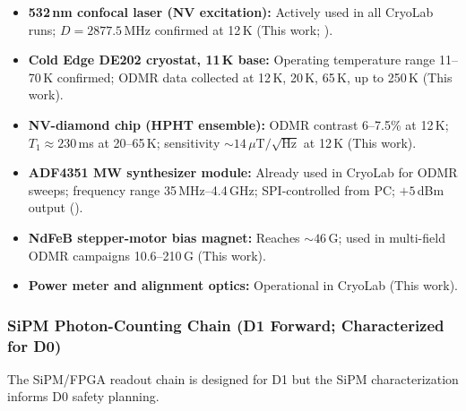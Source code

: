 \begin{itemize}
  \item \textbf{532\,nm confocal laser (NV excitation):} Actively used in all CryoLab
    runs; $D = 2877.5$\,MHz confirmed at 12\,K (This work;
    \cite{Doherty2013}). %
  \item \textbf{Cold Edge DE202 cryostat, 11\,K base:} Operating temperature range 11--70\,K
    confirmed; ODMR data collected at 12\,K, 20\,K, 65\,K, up to 250\,K (This work).
  \item \textbf{NV-diamond chip (HPHT ensemble):} ODMR contrast 6--7.5\% at 12\,K;
    $T_1 \approx 230$\,ms at 20--65\,K; sensitivity $\sim\!14\,\mu\text{T}/\sqrt{\text{Hz}}$
    at 12\,K (This work).
  \item \textbf{ADF4351 MW synthesizer module:} Already used in CryoLab for ODMR sweeps;
    frequency range 35\,MHz--4.4\,GHz; SPI-controlled from PC; $+5$\,dBm output
    (\cite{ADF4351datasheet}). %
  \item \textbf{NdFeB stepper-motor bias magnet:} Reaches $\sim\!46$\,G; used in
    multi-field ODMR campaigns 10.6--210\,G (This work).
  \item \textbf{Power meter and alignment optics:} Operational in CryoLab (This work).
\end{itemize}

\subsubsection{SiPM Photon-Counting Chain (D1 Forward; Characterized for D0)}

The SiPM/FPGA readout chain is designed for D1 but the SiPM characterization informs D0
safety planning.

